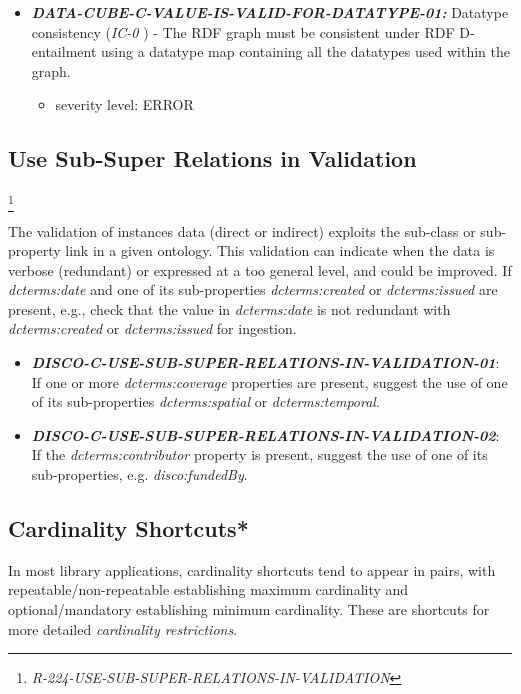 \documentclass{llncs}
\begin{document}
\begin{itemize}
	\item \textbf{{\em DATA-CUBE-C-VALUE-IS-VALID-FOR-DATATYPE-01:}}
	Datatype consistency (\emph{IC-0} \cite{CyganiakReynolds2014}) -  
	The RDF graph must be consistent under RDF D-entailment using a datatype map containing all the datatypes used within the graph. 
	\begin{itemize}
		\item severity level: ERROR
	\end{itemize}
\end{itemize}

\subsection{Use Sub-Super Relations in Validation}

\footnote{\emph{R-224-USE-SUB-SUPER-RELATIONS-IN-VALIDATION}}

The validation of instances data (direct or indirect) exploits the sub-class or sub-property link in a given ontology.
This validation can indicate when the data is verbose (redundant) or expressed at a too general level, and could be improved.
If \emph{dcterms:date} and one of its sub-properties \emph{dcterms:created} or \emph{dcterms:issued} are present, e.g., check that the value in \emph{dcterms:date} is not redundant with \emph{dcterms:created} or \emph{dcterms:issued} for ingestion.

\begin{itemize}
	\item \textbf{{\em DISCO-C-USE-SUB-SUPER-RELATIONS-IN-VALIDATION-01}}: 
	If one or more \emph{dcterms:coverage} properties are present, suggest the use of one of its sub-properties \emph{dcterms:spatial} or \emph{dcterms:temporal}.
	\item \textbf{{\em DISCO-C-USE-SUB-SUPER-RELATIONS-IN-VALIDATION-02}}: 
	If the \emph{dcterms:contributor} property is present, suggest the use of one of its sub-properties, e.g. \emph{disco:fundedBy}.
\end{itemize}

\subsection{Cardinality Shortcuts*}

In most library applications, cardinality shortcuts tend to appear in pairs, with repeatable/non-repeatable establishing maximum cardinality and optional/mandatory establishing minimum cardinality.
These are shortcuts for more detailed \emph{cardinality restrictions}.
\end{document}
